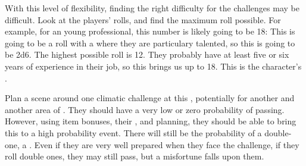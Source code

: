 \documentclass{LegrandOrangeTufteBook}
\begin{document}
With this level of flexibility, finding the right difficulty for the challenges may be difficult. Look at the players' rolls, and find the maximum roll possible. For example, for an young professional,
this number is likely going to be 18: This is going to be a roll with a  where they are particulary talented, so this is going to be 2d6. The highest possible roll is 12. They probably have at least five or six years of experience in their job, so this brings us up to 18. This is the character's .

Plan a scene around one climatic challenge at this , potentially for another  and another area of . They should have a very low or zero probability of passing. However, using item bonuses, their , and planning, they should be able to bring this to a high probability event. There will still be the probability of a double-one, a . Even if they are very well prepared when they face the challenge, if they roll double ones, they may still pass, but a misfortune falls upon them.
\end{document}
